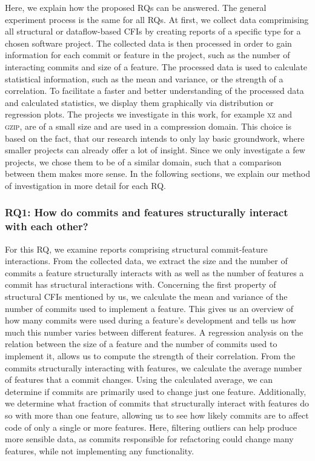 Here, we explain how the proposed RQs can be answered.
The general experiment process is the same for all RQs.
At first, we collect data comprimising all structural or dataflow-based CFIs by creating reports of a specific type for a chosen software project.
The collected data is then processed in order to gain information for each commit or feature in the project, such as the number of interacting commits and size of a feature.
The processed data is used to calculate statistical information, such as the mean and variance, or the strength of a correlation.
To facilitate a faster and better understanding of the processed data and calculated statistics, we display them graphically via distribution or regression plots.
The projects we investigate in this work, for example \textsc{xz} and \textsc{gzip}, are of a small size and are used in a compression domain.
This choice is based on the fact, that our research intends to only lay basic groundwork, where smaller projects can already offer a lot of insight.
Since we only investigate a few projects, we chose them to be of a similar domain, such that a comparison between them makes more sense.
In the following sections, we explain our method of investigation in more detail for each RQ.

\subsubsection*{\textbf{RQ1: How do commits and features structurally interact with each other?}}

For this RQ, we examine reports comprising structural commit-feature interactions.
From the collected data, we extract the size and the number of commits a feature structurally interacts with as well as the number of features a commit has structural interactions with.
Concerning the first property of structural CFIs mentioned by us, we calculate the mean and variance of the number of commits used to implement a feature.
This gives us an overview of how many commits were used during a feature's development and tells us how much this number varies between different features.
A regression analysis on the relation between the size of a feature and the number of commits used to implement it, allows us to compute the strength of their correlation. 
From the commits structurally interacting with features, we calculate the average number of features that a commit changes.
Using the calculated average, we can determine if commits are primarily used to change just one feature.
Additionally, we determine what fraction of commits that structurally interact with features do so with more than one feature, allowing us to see how likely commits are to affect code of only a single or more features.
Here, filtering outliers can help produce more sensible data, as commits responsible for refactoring could change many features, while not implementing any functionality. 

